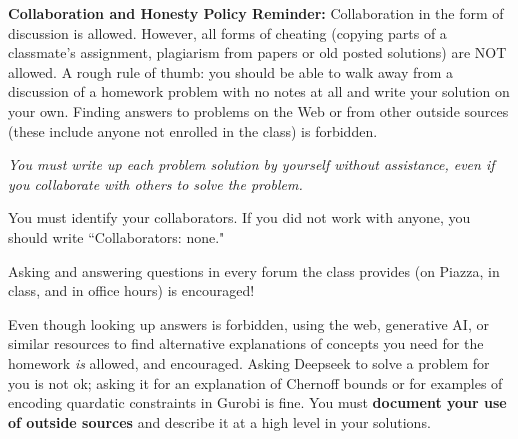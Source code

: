 \documentclass[11pt]{article}
\begin{document}



\noindent
\textbf{Collaboration and Honesty Policy Reminder:}
Collaboration in the form of discussion is allowed. However, all forms
of cheating (copying parts of a classmate’s assignment, plagiarism
from papers or old posted solutions) are NOT allowed. A rough rule of
thumb: you should be able to walk away from a discussion of a homework
problem with no notes at all and write your solution on your own.
%
Finding answers to problems on the
Web or from other outside sources (these include anyone not enrolled
in the class) is forbidden. 

\begin{compactitem}
\item {\em You must write up each problem solution by yourself without
assistance, even if you collaborate with others to solve the
problem.}

\item You must identify your collaborators. If you did not
work with anyone, you should write ``Collaborators: none."

\item Asking and answering questions in every forum the class provides (on Piazza, in class, and in
  office hours) is encouraged!

\item Even though looking up answers is forbidden, using the web, generative AI, 
  or similar resources to find
  alternative explanations of concepts you need for the homework
  \emph{is} allowed, and encouraged. Asking Deepseek to solve a problem for you is not ok; asking it for an explanation of Chernoff bounds or for examples of encoding quardatic constraints in Gurobi is fine. You must \textbf{document your use of outside sources} and describe it at a high level in your solutions.
    \end{compactitem}
\end{document}
